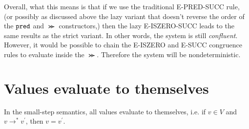 \documentclass[11pt,letterpaper]{article}
\begin{document}
\begin{description}
        Overall, what this means is that if we use the traditional E-PRED-SUCC
        rule, (or possibly as discussed above the lazy variant that doesn't
        reverse the order of the $\operatorname{\mathtt{pred}}$ and $\Succ$ constructors,) then the
        lazy E-ISZERO-SUCC leads to the same results as the strict variant. In
        other words, the system is still \emph{confluent}. However, it would be
        possible to chain the E-ISZERO and E-SUCC congruence rules to evaluate
        inside the $\Succ$. Therefore the system will be nondeterministic.
\end{description}

\section{Values evaluate to themselves}

\begin{prop}
    In the small-step semantics, all values evaluate to themselves,
    i.e. if $v \in V$ and $v \to^* v^\prime$, then $v = v^\prime$.
\end{prop}
\end{document}
